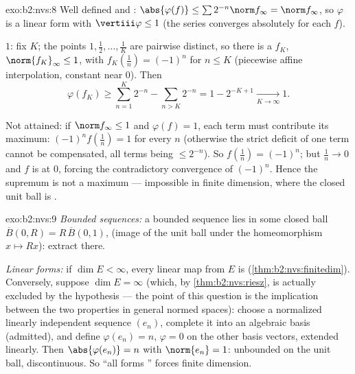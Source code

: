 \begin{solution}{exo:b2:nvs:8}
Well defined and : $\abs{\varphi(f)} \leq \sum 2^{-n}
\norm f_\infty = \norm f_\infty$, so $\varphi$ is a linear form
with $\vertiii\varphi \leq 1$ (the series converges absolutely for
each $f$).

 $1$: fix $K$; the points $1, \frac12, \dots, \frac1K$ are
pairwise distinct, so there is a  $f_K$, $\norm{f_K}_\infty
\leq 1$, with $f_K(\frac1n) = (-1)^n$ for $n \leq K$ (piecewise
affine interpolation, constant near $0$). Then
\[
\varphi(f_K) \geq \sum_{n=1}^{K} 2^{-n} - \sum_{n > K} 2^{-n}
= 1 - 2^{-K+1} \xrightarrow[K \to \infty]{} 1 .
\]

Not attained: if $\norm f_\infty \leq 1$ and $\varphi(f) = 1$, each
term must contribute its maximum: $(-1)^n f(\frac1n) = 1$ for every
$n$ (otherwise the strict deficit of one term cannot be compensated,
all terms being $\leq 2^{-n}$). So $f(\frac1n) = (-1)^n$; but
$\frac1n \to 0$ and $f$ is  at $0$, forcing the
contradictory convergence of $(-1)^n$. Hence the supremum is not a
maximum --- impossible in finite dimension, where the closed unit
ball is .
\end{solution}

\begin{solution}{exo:b2:nvs:9}
\emph{Bounded sequences:} a bounded sequence lies in some closed
ball $\overline B(0, R) = R\,\overline B(0,1)$,  (image of
the  unit ball under the homeomorphism $x \mapsto Rx$):
extract there.

\emph{Linear forms:} if $\dim E < \infty$, every linear map from
$E$ is  (\cref{thm:b2:nvs:finitedim}). Conversely,
suppose $\dim E = \infty$ (which, by \cref{thm:b2:nvs:riesz},
is actually excluded by the  hypothesis --- the point of
this question is the implication between the two properties in
general normed spaces): choose a normalized linearly independent
sequence $(e_n)$, complete it into an algebraic basis (admitted),
and define $\varphi(e_n) = n$, $\varphi = 0$ on the other basis
vectors, extended linearly. Then $\abs{\varphi(e_n)} = n$ with
$\norm{e_n} = 1$: unbounded on the unit ball, discontinuous. So
``all forms '' forces finite dimension.
\end{solution}

